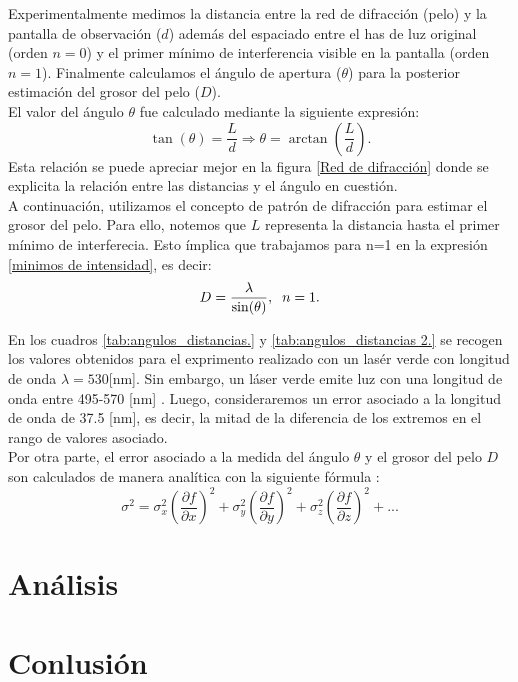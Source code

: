 \documentclass[10pt,a4paper]{article}
\begin{document}
\begin{multicols}{2}
		Experimentalmente medimos la distancia entre la red de difracción (pelo) y la pantalla de observación ($d$) además del  espaciado entre el has de luz original (orden $n = 0$) y el primer mínimo de interferencia visible en la pantalla (orden $n=1$). Finalmente calculamos el ángulo de apertura ($\theta$) para la posterior estimación del grosor del pelo ($D$).\\
		El valor del ángulo $\theta$ fue calculado mediante la siguiente expresión:
		\begin{equation}
		\tan(\theta) = \frac{L}{d} \Longrightarrow \theta = \arctan(\frac{L}{d}).
		\end{equation}
		Esta relación se puede apreciar mejor en la figura \ref{Red de difracción} donde se explicita la relación entre las distancias y el ángulo en cuestión.\\
		A continuación, utilizamos el concepto de patrón de difracción para estimar el grosor del pelo. Para ello, notemos que $L$ representa la distancia hasta el primer mínimo de interferecia. Esto ímplica que trabajamos para n=1 en la expresión \ref{minimos de intensidad}, es decir:
		\begin{equation}
		D = \frac{\lambda}{\sin(\theta)}, \hspace{2mm} n = 1.
		\end{equation}
		
		En los cuadros \ref{tab:angulos_distancias.} y \ref{tab:angulos_distancias 2.} se recogen los valores obtenidos para el exprimento realizado con un lasér verde con longitud de onda $\lambda = 530$[nm]. Sin embargo, un láser verde emite luz con una longitud de onda entre 495-570 [nm] \cite{colors}. Luego, consideraremos un error asociado a la longitud de onda de 37.5 [nm], es decir, la mitad de la diferencia de los extremos en el rango de valores asociado.\\
		
		Por otra parte, el error asociado a la medida del ángulo $\theta$ y el grosor del pelo $D$ son calculados de manera analítica con la siguiente fórmula \cite{error}:
		\begin{equation}\label{errores}
		\sigma^2 = \sigma^2_x \left( \frac{\partial f}{\partial x} \right)^2 + \sigma^2_y \left( \frac{\partial f}{\partial y} \right)^2 + \sigma^2_z \left( \frac{\partial f}{\partial z} \right)^2+...
		\end{equation}
		
	
	
		
	
	
		
	\section{Análisis}

	
	
	

	
	\section{Conlusión}





	
	
	
	\end{multicols}
\end{document}
